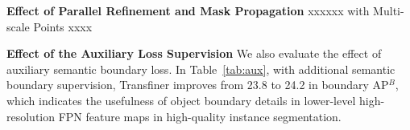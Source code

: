 \documentclass[10pt,twocolumn,letterpaper]{article}
\newcommand{\parsection}[1]{\vspace{1mm}\noindent\textbf{#1}}
\begin{document}
\begin{table}[!h]
	\caption{Effect of the auxiliary semantic boundary supervision.}
	\vspace{-0.1in}
	\centering
	\vspace{-0.1in}
	\label{tab:aux}
\end{table}

\parsection{Effect of Parallel Refinement and Mask Propagation}
xxxxxx
with Multi-scale Points
xxxx

\begin{table}[!h]
	\caption{Effect of the parallel refinement and mask propagation.}
	\vspace{-0.1in}
	\centering
	\vspace{-0.1in}
	\label{tab:prop}
\end{table}

\parsection{Effect of the Auxiliary Loss Supervision} 
We also evaluate the effect of auxiliary semantic boundary loss. In Table~\ref{tab:aux}, with additional semantic boundary supervision, Transfiner improves from 23.8 to 24.2 in boundary AP$^B$, which indicates the usefulness of object boundary details in lower-level high-resolution FPN feature maps in high-quality instance segmentation.
\end{document}
